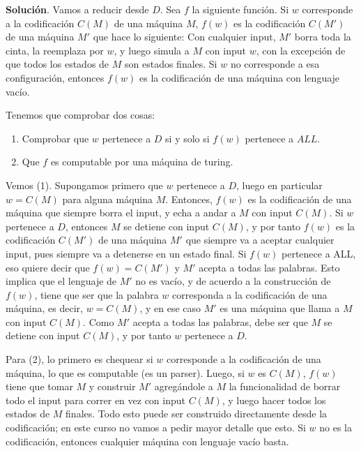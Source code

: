 \documentclass[12pt]{article}
\begin{document}
\medskip
\noindent
\textbf{Solución}. Vamos a reducir desde $D$. 
Sea $f$ la siguiente función. Si $w$ corresponde a la codificación $C(M)$ de una máquina $M$, $f(w)$ es la codificación $C(M')$ de una máquina 
$M'$ que hace lo siguiente: Con cualquier input, $M'$ borra toda la cinta, la reemplaza por $w$, y luego simula a $M$ con input $w$, con la excepción de que todos los 
estados de $M$ son estados finales. 
Si $w$ no corresponde a esa configuración, entonces $f(w)$ es la codificación de una máquina con lenguaje 
vacío. 

Tenemos que comprobar dos cosas: 
\begin{enumerate}
\item Comprobar que $w$ pertenece a $D$ si y solo si $f(w)$ pertenece a $ALL$. 
\item Que $f$ es computable por una máquina de turing. 
\end{enumerate}

Vemos (1). Supongamos primero que $w$ pertenece a $D$, luego en particular $w = C(M)$ para alguna máquina $M$. 
Entonces, $f(w)$ es la codificación de una máquina que siempre borra el input, y echa a andar a $M$ con input $C(M)$. Si $w$ pertenece a $D$, entonces 
$M$ se detiene con input $C(M)$, y por tanto $f(w)$ es la codificación $C(M')$ de una máquina $M'$ que siempre va a aceptar cualquier input, pues siempre va a detenerse en un estado final. 
Si $f(w)$ pertenece a ALL, eso quiere decir que $f(w) = C(M')$ y $M'$ acepta a todas las palabras. Esto implica que el lenguaje de $M'$ no es vacío, y de acuerdo a 
la construcción de $f(w)$, tiene que ser que la palabra $w$ corresponda a la codificación de una máquina, es decir, $w = C(M)$, y en ese caso $M'$ es una máquina que llama a $M$ con input $C(M)$. Como $M'$ acepta a todas las palabras, debe ser que $M$ se detiene con input $C(M)$, y por tanto $w$ pertenece a $D$. 

\smallskip

Para (2), lo primero es chequear si $w$ corresponde a la codificación de una máquina, lo que es computable (es un parser). Luego, si $w$ es $C(M)$, $f(w)$ tiene que tomar $M$ y construir $M'$ agregándole a $M$ la funcionalidad de borrar todo el input para correr en vez con input $C(M)$, y luego hacer todos los estados de $M$ finales. Todo esto puede ser construido directamente desde la codificación; en este curso no vamos a pedir mayor detalle que esto. Si $w$ no es la codificación, entonces cualquier máquina con lenguaje vacío basta. 
\end{document}
